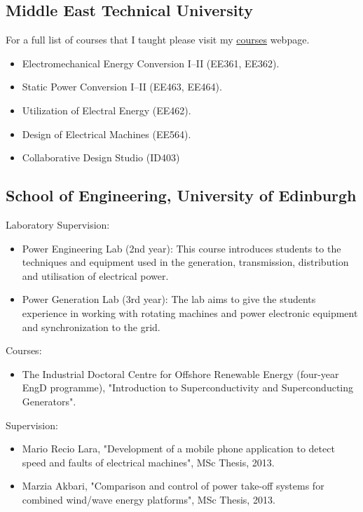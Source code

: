 \documentclass[a4paper,12pt]{article}
\begin{document}
\subsection{Middle East Technical University}

For a full list of courses that I taught please visit my \href{http://keysan.me/courses}{courses} webpage. 

\begin{itemize}
\item Electromechanical Energy Conversion I--II (EE361, EE362).
\item Static Power Conversion I--II (EE463, EE464).
\item Utilization of Electral Energy (EE462).
\item Design of Electrical Machines (EE564).
\item Collaborative Design Studio (ID403)
\end{itemize}


\subsection{School of Engineering, University of Edinburgh}

Laboratory Supervision:
\begin{itemize}
\item Power Engineering Lab (2nd year): This course introduces students to the techniques and equipment used in the generation, transmission, distribution and utilisation of electrical power.
\item Power Generation Lab (3rd year): The lab aims to give the students experience in working with rotating machines and power electronic equipment and synchronization to the grid. 

\end{itemize}

Courses:
\begin{itemize}
\item The Industrial Doctoral Centre for Offshore Renewable Energy (four-year EngD programme), "Introduction to Superconductivity and Superconducting Generators".
\end{itemize}


Supervision:
\begin{itemize}
\item Mario Recio Lara, "Development of a mobile phone application to detect speed and faults of electrical machines", MSc Thesis, 2013.
\item Marzia Akbari, "Comparison and control of power take-off systems for combined wind/wave energy platforms", MSc Thesis, 2013.
\end{itemize}
\end{document}
